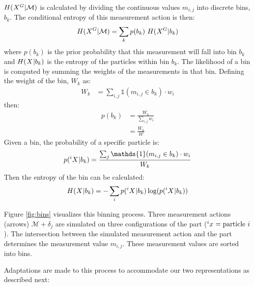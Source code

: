 \documentclass[letterpaper, 10 pt, conference]{ieeeconf}
\newcommand{\maction}{\mathcal{M}}
\newcommand{\bin}{b}
\newcommand{\measurement}{m}
\newcommand{\totalWeight}{\mathcal{W}}
\begin{document}
$H(\particles[][][G]|\maction)$ is calculated by dividing the continuous values $\measurement_{i,j}$ into discrete bins, $\bin_k$.
The conditional entropy of this measurement action is then:
\begin{align}
    H(\particles[][][G]|\maction) = \sum_k p(\bin_k) \  H(\particles[][][G] | \bin_k)
\end{align}
where $p(\bin_k)$ is the prior probability that this measurement will fall into bin $\bin_k$ and
$H(\particles | \bin_k)$ is the entropy of the particles within bin $\bin_k$. 
The likelihood of a bin is computed by summing the weights of the measurements in that bin. Defining the weight of the bin, $W_k$ as:
\begin{align}
  W_k &= \sum_{i,j} \mathds{1}(\measurement_{i,j} \in \bin_k) \cdot w_i
\end{align}
then:
\begin{align}
  p(\bin_k) &= \frac{W_k}{\sum_{i,j}w_i}\\
  &= \frac{W_k}{\totalWeight}
\end{align}
Given a bin, the probability of a specific particle is:
\begin{align}
  p(\particles[][i]| \bin_k) = \frac{\sum_{j} \mathds{1}(\measurement_{i,j} \in \bin_k) \cdot w_i}{W_k}
\end{align}
Then the entropy of the bin can be calculated:
\begin{align}
  H(\particles | \bin_k) = -\sum_i p(\particles[][i]|\bin_k) \log(p(\particles[][i]|\bin_k))
\end{align}

Figure \ref{fig:bins} visualizes this binning process. Three measurement actions (arrows) $\maction + \delta_j$ are simulated on three configurations of the part ($\particle[][i] = \text{particle } i$). The intersection between the simulated measurement action and the part determines the measurement value $\measurement_{i,j}$. These measurement values are sorted into bins.

Adaptations are made to this process to accommodate our two representations as described next:
\end{document}
